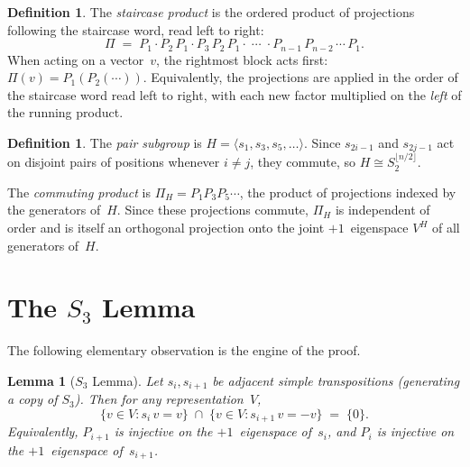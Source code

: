 \documentclass[12pt]{article}
\newtheorem{lemma}[theorem]{Lemma}
\theoremstyle{definition}
\newtheorem{definition}[theorem]{Definition}
\theoremstyle{remark}
\begin{document}
\begin{definition}
The \emph{staircase product} is the ordered product of projections following the
staircase word, read left to right:
\[
  \Pi \;=\; P_1 \cdot P_2\, P_1 \cdot P_3\, P_2\, P_1 \cdot \;\cdots\; \cdot
  P_{n-1}\, P_{n-2}\, \cdots\, P_1.
\]
When acting on a vector~$v$, the rightmost block acts first: $\Pi(v) = P_1(P_2(\cdots))$.
Equivalently, the projections are applied in the order of the staircase word read
left to right, with each new factor multiplied on the \emph{left} of the running product.
\end{definition}

\begin{definition}
The \emph{pair subgroup} is $H = \langle s_1, s_3, s_5, \ldots \rangle$.
Since $s_{2i-1}$ and $s_{2j-1}$ act on disjoint pairs of positions whenever $i \neq j$,
they commute, so $H \cong S_2^{\lfloor n/2 \rfloor}$.

The \emph{commuting product} is $\Pi_H = P_1 P_3 P_5 \cdots$, the product of
projections indexed by the generators of~$H$.  Since these projections commute,
$\Pi_H$ is independent of order and is itself an orthogonal projection onto the
joint $+1$~eigenspace $V^H$ of all generators of~$H$.
\end{definition}

\section{The $S_3$ Lemma}

The following elementary observation is the engine of the proof.

\begin{lemma}[$S_3$ Lemma]
\label{lem:S3}
Let $s_i, s_{i+1}$ be adjacent simple transpositions (generating a copy of $S_3$).
Then for any representation~$V$,
\[
  \{v \in V : s_i\, v = v\} \;\cap\; \{v \in V : s_{i+1}\, v = -v\} \;=\; \{0\}.
\]
Equivalently, $P_{i+1}$ is injective on the $+1$~eigenspace of~$s_i$, and $P_i$ is
injective on the $+1$~eigenspace of~$s_{i+1}$.
\end{lemma}
\end{document}
